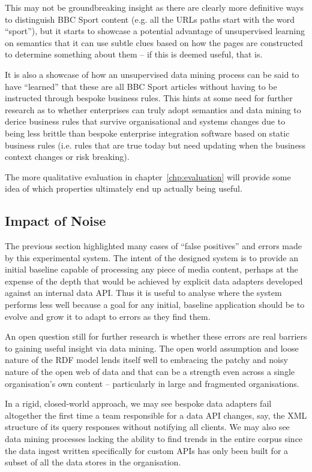 This may not be groundbreaking insight as there are clearly more
definitive ways to distinguish BBC Sport content (e.g. all the URLs
paths start with the word ``sport''), but it starts to showcase a
potential advantage of unsupervised learning on semantics that it
can use subtle clues based on how the pages are constructed to
determine something about them -- if this is deemed useful, that is.

It is also a showcase of how an unsupervised data mining process can
be said to have ``learned'' that these are all BBC Sport articles
without having to be instructed through bespoke business rules. This
hints at some need for further research as to whether enterprises
can truly adopt semantics and data mining to derice business rules
that survive organisational and systems changes due to being less
brittle than bespoke enterprise integration software based on static
business rules (i.e. rules that are true today but need updating when
the business context changes or risk breaking).

The more qualitative evaluation in chapter~\ref{chp:evaluation} will
provide some idea of which properties ultimately end up actually being
useful.

\subsection{Impact of Noise}
\label{sec:impact-of-noise}

The previous section highlighted many cases of ``false positives''
and errors made by this experimental system. The intent of the
designed system is to provide an
initial baseline capable of processing any piece of media content,
perhaps at the expense of the depth that would be achieved by explicit
data adapters developed against an internal data API. Thus it is
useful to analyse where the system performs less well because a goal
for any initial, baseline application should be to evolve and grow it
to adapt to errors as they find them.

An open question still for further research is whether these errors
are real barriers to gaining useful insight via data mining. The
open world assumption and loose nature of the RDF model lends itself
well to embracing the patchy and noisy nature of the open web of data
and that can be a strength even across a single organisation's
own content -- particularly in large and fragmented organisations.

In a rigid, closed-world approach, we may see bespoke data adapters
fail altogether the first time a team responsible for a data API
changes, say, the XML structure of its query responses without
notifying all clients. We may also see data mining processes lacking
the ability to find trends in the entire corpus since the data
ingest written specifically for custom APIs has only been built for
a subset of all the data stores in the organisation.

